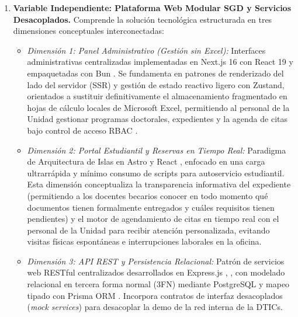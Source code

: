 \begin{enumerate}[label=\textbf{Eje \arabic*:},leftmargin=*]
    \item \textbf{Variable Independiente: Plataforma Web Modular SGD y Servicios Desacoplados.} Comprende la solución tecnológica estructurada en tres dimensiones conceptuales interconectadas:
    \begin{itemize}[leftmargin=*,noitemsep]
        \item \textit{Dimensión 1: Panel Administrativo (Gestión sin Excel):} Interfaces administrativas centralizadas implementadas en Next.js 16 con React 19 y empaquetadas con Bun \cite{vercel_nextjs}. Se fundamenta en patrones de renderizado del lado del servidor (SSR) y gestión de estado reactivo ligero con Zustand, orientados a sustituir definitivamente el almacenamiento fragmentado en hojas de cálculo locales de Microsoft Excel, permitiendo al personal de la Unidad gestionar programas doctorales, expedientes y la agenda de citas bajo control de acceso RBAC \cite{ferraiolo_rbac}.
        \item \textit{Dimensión 2: Portal Estudiantil y Reservas en Tiempo Real:} Paradigma de Arquitectura de Islas en Astro y React \cite{astro_docs}, enfocado en una carga ultrarrápida y mínimo consumo de scripts para autoservicio estudiantil. Esta dimensión conceptualiza la transparencia informativa del expediente (permitiendo a los docentes becarios conocer en todo momento qué documentos tienen formalmente entregados y cuáles requisitos tienen pendientes) y el motor de agendamiento de citas en tiempo real con el personal de la Unidad para recibir atención personalizada, evitando visitas físicas espontáneas e interrupciones laborales en la oficina.
        \item \textit{Dimensión 3: API REST y Persistencia Relacional:} Patrón de servicios web RESTful centralizados desarrollados en Express.js \cite{fielding_rest}, \cite{express_docs}, con modelado relacional en tercera forma normal (3FN) mediante PostgreSQL \cite{silberschatz} y mapeo tipado con Prisma ORM \cite{prisma_docs}. Incorpora contratos de interfaz desacoplados (\textit{mock services}) para desacoplar la demo de la red interna de la DTICs.
    \end{itemize}
    

\end{enumerate}
